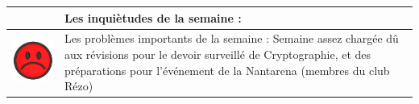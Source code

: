 \documentclass[12pt,titlepage,french]{article}
\begin{document}
\begin{tabularx}{17cm}{|p{5cm}|X|}
\begin{minipage}{.3\textwidth}
    \end{minipage}
    &
    Les inquiètudes de la semaine : \\
\hline
     \begin{minipage}{.3\textwidth}
      \includegraphics[width=\linewidth]{img/smsad.jpg}
    \end{minipage}
    &
    Les problèmes importants de la semaine : Semaine assez chargée dû aux révisions pour le devoir surveillé de Cryptographie, et des préparations pour l'événement de la Nantarena (membres du club Rézo)\\
\hline
\end{tabularx}
\end{document}
